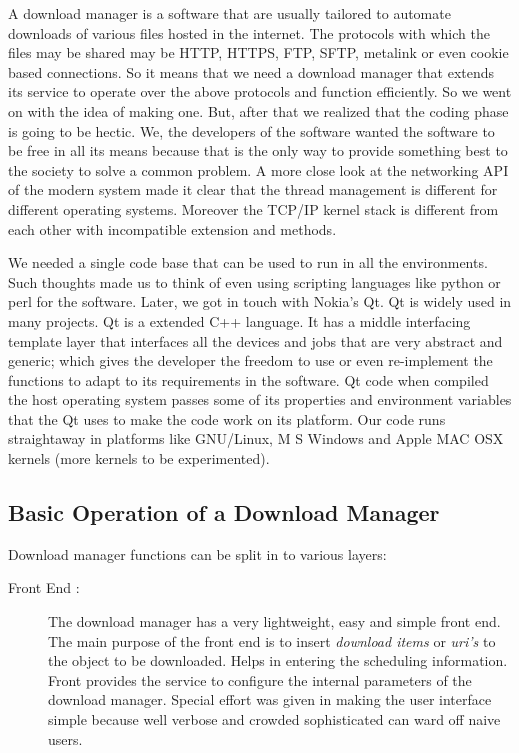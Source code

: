 \documentclass[pdftex,12pt,a4paper,pdfencoding=unicode]{article}
\begin{document}
\begin{onehalfspace}
      A download manager is a software that are usually tailored to automate downloads of various files hosted in the internet. The
      protocols with which the files may be shared may be HTTP, HTTPS, FTP, SFTP, metalink or even cookie based connections. So it means
      that we need a download manager that extends its service to operate over the above protocols and function efficiently. So we went
      on with the idea of making one. But, after that we realized that the coding phase is going to be hectic. We, the developers of the
      software wanted the software to be free in all its means because that is the only way to provide something best to the society to
      solve a common problem. A more close look at the networking API of the modern system made it clear that the thread management is
      different for different operating systems. Moreover the TCP/IP kernel stack is different from each other with incompatible extension
      and methods.

      We needed a single code base that can be used to run in all the environments. Such thoughts made us to think of even using scripting
      languages like python or perl for the software. Later, we got in touch with Nokia's Qt. Qt is widely used in many projects. Qt is a
      extended C++ language. It has a middle interfacing template layer that interfaces all the devices and jobs that are very abstract and
      generic; which gives the developer the freedom to use or even re-implement the functions to adapt to its requirements in the software.
      Qt code when compiled the host operating system passes some of its properties and environment variables that the Qt uses to make the
      code work on its platform. Our code runs straightaway in platforms like GNU/Linux, M S Windows and Apple MAC OSX kernels (more kernels
      to be experimented).

      \subsection{Basic Operation of a Download Manager}
      Download manager functions can be split in to various layers:
      \begin{description}
      \item[Front End :] The download manager has a very lightweight, easy and simple front end. The main purpose of the front end is to
        insert \emph{download items} or \emph{uri's} to the object to be downloaded. Helps in entering the scheduling information.
        Front provides the service to configure the internal parameters of the download manager. Special effort was given in making the
        user interface simple because well verbose and crowded sophisticated can ward off naive users.


\end{description}
\end{onehalfspace}
\end{document}
